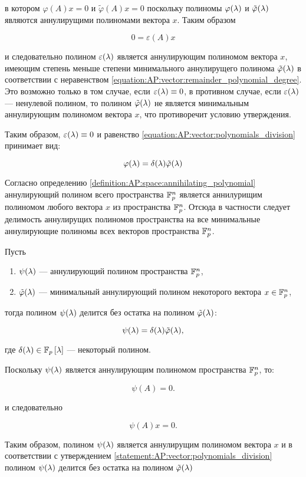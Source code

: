 \begin{statement}
	в котором $\varphi(A) x = 0$ и $\tilde\varphi(A) x = 0$ поскольку полиномы $\varphi (\lambda)$ и $\tilde\varphi (\lambda)$
	являются аннулирущими полиномами вектора $x$. Таким образом

		$$ 0 = \varepsilon(A) x $$

	и следовательно полином $\varepsilon (\lambda)$ является аннулирующим полиномом вектора $x$, имеющим степень меньше степени минимального
	аннулирущего полинома $\tilde\varphi (\lambda)$ в соответствии с неравенством \eqref{equation:AP:vector:remainder_polynomial_degree}.
	Это возможно только в том случае, если $\varepsilon (\lambda) \equiv 0$, в противном случае, если $\varepsilon (\lambda)$ ---
	ненулевой полином, то полином $\tilde\varphi (\lambda)$ не является минимальным аннулирующим полиномом вектора $x$, что противоречит
	условию утверждения.

	Таким образом, $\varepsilon (\lambda) \equiv 0$ и равенство \eqref{equation:AP:vector:polynomials_division} принимает вид:

		$$ \varphi (\lambda) = \delta (\lambda) \tilde\varphi (\lambda) $$
\end{statement}

Согласно определению \ref{definition:AP:space:annihilating_polynomial} аннулирующий полином всего пространства $\mathbb{F}^{n}_p$ является
аннилурищим полиномом любого вектора $x$ из пространства $\mathbb{F}^{n}_p$. Отсюда в частности следует делимость аннулирущих полиномов
пространства на все минимальные аннулирующие полиномы всех векторов пространства $\mathbb{F}^{n}_p$.

\begin{statement} \label{statement:AP:vector:space_polynomials_division}
	Пусть
	\begin{enumerate}
		\item $\psi (\lambda)$ --- аннулирующий полином пространства $\mathbb{F}^{n}_p$,
		\item $\tilde\varphi (\lambda)$ --- минимальный аннулирующий полином некоторого вектора $x \in \mathbb{F}^{n}_p$,
	\end{enumerate}
	тогда полином $\psi (\lambda)$ делится без остатка на полином $\tilde\varphi (\lambda)$:

		$$ \psi (\lambda) = \delta (\lambda) \tilde\varphi (\lambda), $$

	где $\delta (\lambda) \in \mathbb{F}_p \left [ \lambda \right ]$ --- некоторый полином.

	\proof

	Поскольку $\psi (\lambda)$ является аннулирующим полиномом пространства $\mathbb{F}^{n}_p$, то:

		$$ \psi(A) = 0. $$

	и следовательно

		$$ \psi(A) x = 0. $$

	Таким образом, полином $\psi (\lambda)$ является аннулирущим полиномом вектора $x$ и в соответствии с утверждением
	\ref{statement:AP:vector:polynomials_division} полином $\psi (\lambda)$ делится без остатка на полином
	$\tilde\varphi (\lambda)$
\end{statement}

